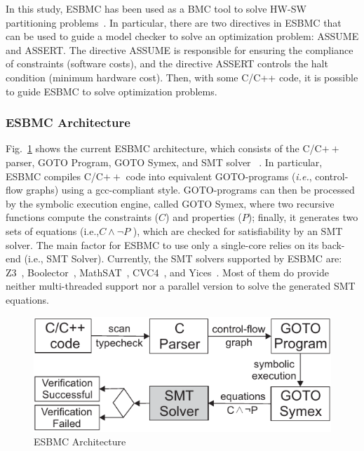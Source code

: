 In this study, ESBMC has been used as a BMC tool to solve HW-SW partitioning problems~\cite{Cordeiro2012}. 
In particular, there are two directives in ESBMC that can be used to guide a model checker to solve an optimization problem: ASSUME and ASSERT. The directive ASSUME is responsible for ensuring the compliance of constraints (software costs), and the directive ASSERT controls the halt condition (minimum hardware cost). Then, with some C/C++ code, it is possible to guide ESBMC to solve optimization problems.

\subsubsection{ESBMC Architecture}
\label{ESBMCArchitecture}

Fig.~\ref{ESBMC-Architecture} shows the current ESBMC architecture, which consists of the C/C$++$ parser, GOTO Program, GOTO Symex, and SMT solver ~\cite{Ramalho2013}. In particular, ESBMC compiles C/C$++$ code into equivalent GOTO\hyp{}programs ({\it i.e.}, control-flow graphs) using a gcc-compliant style. GOTO-programs can then be processed by the symbolic execution engine, called GOTO Symex, where two recursive functions compute the constraints ($C$) and properties ($P$); finally, it generates two sets of equations (i.e.,\:$C \land \neg P$ ), which are checked for satisfiability by an SMT solver. The main factor for ESBMC to use only a single-core relies on its back-end (i.e., SMT Solver). Currently, the SMT solvers supported by ESBMC are: Z3~\cite{DeMoura2008}, Boolector~\cite{Brummayer2009}, MathSAT~\cite{Barrett2011}, CVC4~\cite{Bozzano2005}, and Yices~\cite{Dutertre2014}. Most of them do provide neither multi-threaded support nor a parallel version to solve the generated SMT equations.
%
\begin{figure}[ht]
	\centering
  \includegraphics[scale=0.9]{Image/esbmc-arch-new.pdf} 
	\caption{ESBMC Architecture}
	\label{ESBMC-Architecture}
\end{figure}

